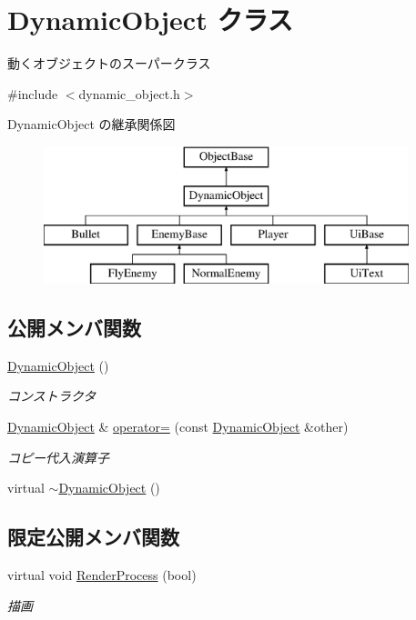 \hypertarget{class_dynamic_object}{}\section{Dynamic\+Object クラス}
\label{class_dynamic_object}


動くオブジェクトのスーパークラス  




{\ttfamily \#include $<$dynamic\+\_\+object.\+h$>$}

Dynamic\+Object の継承関係図\begin{figure}[H]
\begin{center}
\leavevmode
\includegraphics[height=4.000000cm]{class_dynamic_object}
\end{center}
\end{figure}
\subsection*{公開メンバ関数}
\begin{DoxyCompactItemize}
\item 
\mbox{\hyperlink{class_dynamic_object_a50a7adf3d7d1f411ed2aa9a663bfe275}{Dynamic\+Object}} ()
\begin{DoxyCompactList}\small\item\em コンストラクタ \end{DoxyCompactList}\item 
\mbox{\hyperlink{class_dynamic_object}{Dynamic\+Object}} \& \mbox{\hyperlink{class_dynamic_object_a3fed8d7c31826cc2f92fcd788a2feeb8}{operator=}} (const \mbox{\hyperlink{class_dynamic_object}{Dynamic\+Object}} \&other)
\begin{DoxyCompactList}\small\item\em コピー代入演算子 \end{DoxyCompactList}\item 
virtual \mbox{\hyperlink{class_dynamic_object_af9141dddf35d338d5bae491cb0455583}{$\sim$\+Dynamic\+Object}} ()
\end{DoxyCompactItemize}
\subsection*{限定公開メンバ関数}
\begin{DoxyCompactItemize}
\item 
virtual void \mbox{\hyperlink{class_dynamic_object_aa7488e1b4dfd7049447535d93d9d6783}{Render\+Process}} (bool)
\begin{DoxyCompactList}\small\item\em 描画 \end{DoxyCompactList}\end{DoxyCompactItemize}
